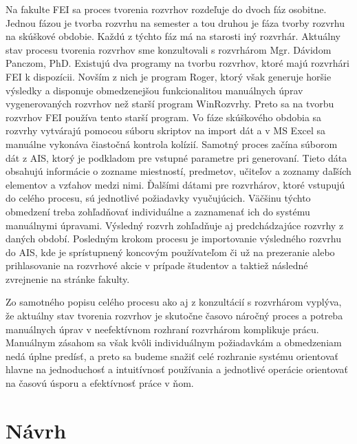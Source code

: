 Na fakulte FEI sa proces
tvorenia rozvrhov rozdeľuje do dvoch fáz osobitne. Jednou fázou je tvorba rozvrhu na
semester a tou druhou je fáza tvorby rozvrhu na skúškové obdobie. Každú z týchto fáz má
na starosti iný rozvrhár. Aktuálny stav procesu tvorenia rozvrhov sme konzultovali s
rozvrhárom Mgr. Dávidom Panczom, PhD. Existujú dva programy na tvorbu rozvrhov,
ktoré majú rozvrhári FEI k dispozícii. Novším z nich je program Roger, ktorý však generuje
horšie výsledky a disponuje obmedzenejšou funkcionalitou manuálnych úprav
vygenerovaných rozvrhov než starší program WinRozvrhy. Preto sa na tvorbu rozvrhov FEI
používa tento starší program. Vo fáze skúškového obdobia sa rozvrhy vytvárajú pomocou
súboru skriptov na import dát a v MS Excel sa manuálne vykonáva čiastočná kontrola kolízií.
Samotný proces začína súborom dát z AIS, ktorý je podkladom pre vstupné parametre pri
generovaní. Tieto dáta obsahujú informácie o zozname miestností, predmetov, učiteľov a
zoznamy daľších elementov a vzťahov medzi nimi. Ďalšími dátami pre rozvrhárov, ktoré
vstupujú do celého procesu, sú jednotlivé požiadavky vyučujúcich. Väčšinu týchto obmedzení
treba zohľadňovať individuálne a zaznamenať ich do systému manuálnymi úpravami. 
Výsledný rozvrh zohľadňuje aj predchádzajúce rozvrhy z daných období. Posledným
krokom procesu je importovanie výsledného rozvrhu do AIS, kde je sprístupnený koncovým
používateľom či už na prezeranie alebo prihlasovanie na rozvrhové akcie v prípade študentov
a taktiež následné zvrejnenie na stránke fakulty.

Zo samotného popisu celého procesu ako aj z konzultácií s rozvrhárom vyplýva, že aktuálny
stav tvorenia rozvrhov je skutočne časovo náročný proces a potreba manuálnych úprav v
neefektívnom rozhraní rozvrhárom komplikuje prácu. Manuálnym zásahom sa však kvôli
individuálnym požiadavkám a obmedzeniam nedá úplne predísť, a preto sa budeme snažiť
celé rozhranie systému orientovať hlavne na jednoduchosť a intuitívnosť používania a
jednotlivé operácie orientovať na časovú úsporu a efektívnosť práce v ňom.
\section{Návrh}
\label{sec:design}

